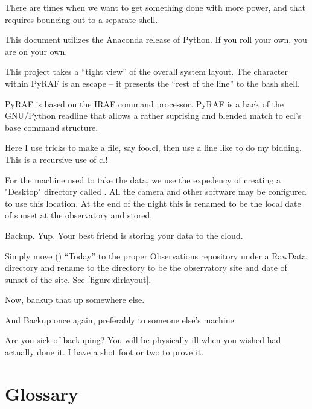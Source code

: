 \documentclass[letter,11pt,oneside]{article}
\newcommand{\dhl}[1]{{\color{verbcolor}{\texttt#1}}}
\begin{document}
There are times when we want to get something done with more power,
and that requires bouncing out to a separate shell.

This document utilizes the Anaconda release of Python. If you roll your own,
you are on your own. 

This project takes a ``tight view'' of the overall system layout. The
\dhl{!} character within PyRAF is an escape -- it presents the 
``rest of the line'' to the bash shell. 

PyRAF is based on the IRAF \dhl{ecl} command processor. PyRAF is a
hack of the GNU/Python readline that allows a rather suprising and
blended match to ecl's base command structure.

Here I use tricks to make a \dhl{.cl} file, say foo.cl, then use a line
like \dhl{cl < foo.cl} to do my bidding. This is a recursive use of cl!

For the machine used to take the data, we use the expedency of
creating a "Desktop" directory called \dhl{Today}. All the camera and
other software may be configured to use this location. At the end of
the night this is renamed to be the local date of sunset at the
observatory and stored.

Backup. Yup. Your best friend is storing your data to the cloud.

Simply move (\dhl{mv}) ``Today'' to the proper Observations repository
under a RawData directory and rename to the directory to be the
observatory site and date of sunset of the site. See \ref{figure:dirlayout}.

Now, backup that up somewhere else.

And Backup once again, preferably to someone else's machine.

Are you sick of backuping? You will be physically ill when you wished
had actually done it. I have a shot foot or two to prove it.




\section{Glossary}

\printglossaries

\clearpage
\renewcommand*{\refname}{Bibliography and References}
\end{document}
